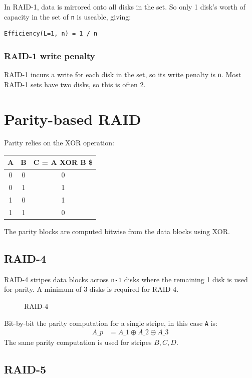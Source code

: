 In RAID-1, data is mirrored onto all disks in the set. So only 1 disk's
worth of capacity in the set of \texttt{n} is useable, giving:

\begin{verbatim}
Efficiency(L=1, n) = 1 / n 
\end{verbatim}

\subsubsection{RAID-1 write penalty}\label{raid-1-write-penalty}

RAID-1 incurs a write for each disk in the set, so its write penalty is
\texttt{n}. Most RAID-1 sets have two disks, so this is often 2.

\section{Parity-based RAID}\label{parity-based-raid}

Parity relies on the XOR operation:

\begin{tabular}{@{}ccc@{}}
\toprule
A & B & C = A XOR B \$\tabularnewline
\midrule
0 & 0 & 0\tabularnewline
0 & 1 & 1\tabularnewline
1 & 0 & 1\tabularnewline
1 & 1 & 0\tabularnewline
\bottomrule
\end{tabular}

The parity blocks are computed bitwise from the data blocks using XOR.

\subsection{RAID-4}\label{raid-4}

RAID-4 stripes data blocks across \texttt{n-1} disks where the remaining
1 disk is used for parity. A minimum of 3 disks is required for RAID-4.

\begin{figure}
\centering
\caption{RAID-4}
\end{figure}

Bit-by-bit the parity computation for a single stripe, in this case
\texttt{A} is:
\begin{align}
  A\_p & = A\_1 \oplus A\_2 \oplus A\_3 
\end{align}
The same parity computation is used for stripes $B, C, D$.

\subsection{RAID-5}\label{raid-5}

